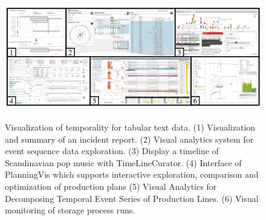 \documentclass[a4paper,fleqn]{cas-dc}
\begin{document}
\begin{figure}[pos=!h]
	\centering
	\includegraphics[width=\textwidth]{Images/tabular text data.pdf}
	\vspace{-4em}
	\caption{Visualization of temporality for tabular text data. (1) Visualization and summary of an incident report. (2) Visual analytics system for event sequence data exploration. (3) Display a timeline of Scandinavian pop music with TimeLineCurator. (4) Interface of PlanningVis which supports interactive exploration, comparison and optimization of production plans (5) Visual Analytics for Decomposing Temporal Event Series of Production Lines. (6) Visual monitoring of storage process runs.}
	\label{fig:tabulartextdata}
	\vspace{-1.5em}
\end{figure}


\end{document}
